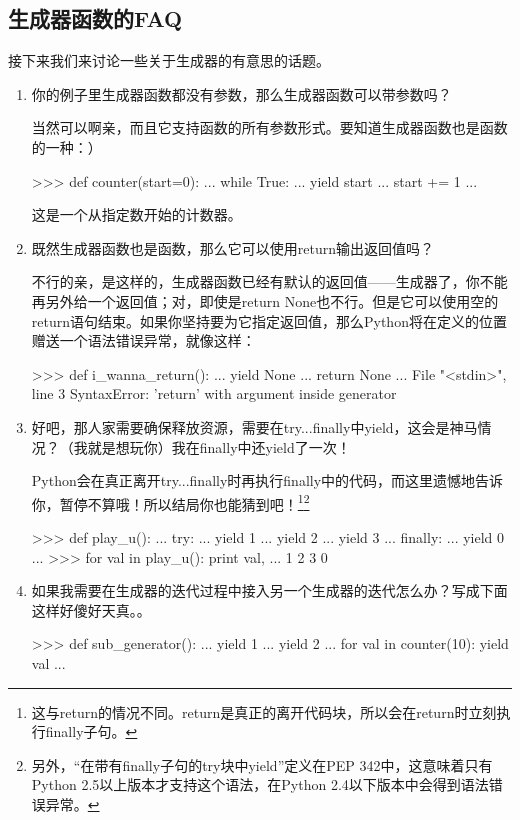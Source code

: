 \documentclass[12pt,a4paper]{report}
\begin{document}
\subsection{生成器函数的FAQ} 
接下来我们来讨论一些关于生成器的有意思的话题。 

\begin{enumerate}
    \item 你的例子里生成器函数都没有参数，那么生成器函数可以带参数吗？ 
        
        当然可以啊亲，而且它支持函数的所有参数形式。要知道生成器函数也是函数的一种：）
        \begin{python}[moreemph={[4]42},caption={},label=ex1]
>>> def counter(start=0):
...   while True:
...     yield start
...     start += 1
...
        \end{python}

这是一个从指定数开始的计数器。

    \item 既然生成器函数也是函数，那么它可以使用return输出返回值吗？

不行的亲，是这样的，生成器函数已经有默认的返回值——生成器了，你不能再另外给一个返回值；对，即使是return None也不行。但是它可以使用空的return语句结束。如果你坚持要为它指定返回值，那么Python将在定义的位置赠送一个语法错误异常，就像这样：

        \begin{python}[moreemph={[4]42},caption={},label=ex1]
>>> def i_wanna_return():
...   yield None
...   return None
...
  File "<stdin>", line 3
  SyntaxError: 'return' with argument inside generator
        \end{python}

    \item 好吧，那人家需要确保释放资源，需要在try...finally中yield，这会是神马情况？（我就是想玩你）我在finally中还yield了一次！

Python会在真正离开try...finally时再执行finally中的代码，而这里遗憾地告诉你，暂停不算哦！所以结局你也能猜到吧！\footnote{这与return的情况不同。return是真正的离开代码块，所以会在return时立刻执行finally子句。}\footnote{另外，“在带有finally子句的try块中yield”定义在PEP 342中，这意味着只有Python 2.5以上版本才支持这个语法，在Python 2.4以下版本中会得到语法错误异常。}
        \begin{python}[moreemph={[4]42},caption={},label=ex1]
>>> def play_u():
...   try:
...     yield 1
...     yield 2
...     yield 3
...   finally:
...     yield 0
...
>>> for val in play_u(): print val,
...
1 2 3 0
        \end{python}
    \item 如果我需要在生成器的迭代过程中接入另一个生成器的迭代怎么办？写成下面这样好傻好天真。。 
        \begin{python}[moreemph={[4]42},caption={},label=ex1]
>>> def sub_generator():
...   yield 1
...   yield 2
...   for val in counter(10): yield val
...
        \end{python}
        

\end{enumerate}
\end{document}
